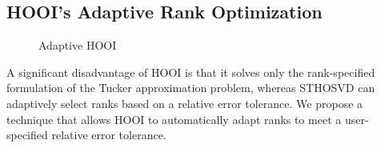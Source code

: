 \subsection{HOOI's Adaptive Rank Optimization} \label{sec:HOOI's Adaptive Rank Optimization}

    \begin{figure}
        \centering
        
        \caption{Adaptive HOOI}
        \label{fig:adaptive_hooi}
    \end{figure}

    A significant disadvantage of HOOI is that it solves only the rank-specified
    formulation of the Tucker approximation problem, whereas STHOSVD can
    adaptively select ranks based on a relative error tolerance. We propose a
    technique that allows HOOI to automatically adapt ranks to meet a
    user-specified relative error tolerance. 

